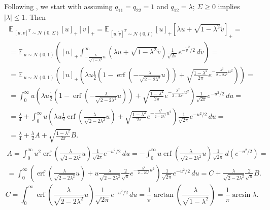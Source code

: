 \documentclass{article}
\newcommand{\EE}{\mathbb{E}\,}
\newcommand{\NN}{\mathcal{N}}
\DeclareMathOperator*{\erf}{erf}
\begin{document}
    Following \cite{arora2019exact}, we start with assuming $q_{11} = q_{22} = 1$ and $q_{12} = \lambda$; $\Sigma \geq 0$ implies $|\lambda| \leq 1$.
    Then
    \begin{multline}
        \EE_{[u,v]^T \sim \NN(0,\Sigma)} [u]_+ [v]_+
        = \EE_{[u,\tilde v]^T \sim \NN(0,I)} [u]_+ \left[\lambda u + \sqrt{1-\lambda^2} \tilde v\right]_+
        =\\= \EE_{u \sim \NN(0,1)} \left([u]_+ \int_{-\frac{\lambda}{\sqrt{1-\lambda^2}} u}^\infty \left(\lambda u + \sqrt{1-\lambda^2} \tilde v\right) \frac{1}{\sqrt{2\pi}} e^{-\tilde v^2/2} \, d\tilde v \right)
        =\\= \EE_{u \sim \NN(0,1)} \left(
            [u]_+ \left(
                \lambda u \frac{1}{2} \left(1 - \erf\left(-\frac{\lambda}{\sqrt{2-2\lambda^2}} u\right)\right) + \sqrt{\frac{1-\lambda^2}{2\pi}} e^{-\frac{\lambda^2}{2-2\lambda^2} u^2}
            \right)
        \right)
        =\\= \int_0^\infty u \left(\lambda u \frac{1}{2} \left(1 - \erf\left(-\frac{\lambda}{\sqrt{2-2\lambda^2}} u\right)\right) + \sqrt{\frac{1-\lambda^2}{2\pi}} e^{-\frac{\lambda^2}{2-2\lambda^2} u^2}\right) \frac{1}{\sqrt{2\pi}} e^{-u^2/2} \, du
        =\\= \frac{\lambda}{4} + \int_0^\infty u \left(\lambda u \frac{1}{2} \erf\left(\frac{\lambda}{\sqrt{2-2\lambda^2}} u\right) + \sqrt{\frac{1-\lambda^2}{2\pi}} e^{-\frac{\lambda^2}{2-2\lambda^2} u^2}\right) \frac{1}{\sqrt{2\pi}} e^{-u^2/2} \, du
        =\\= \frac{\lambda}{4} + \frac{\lambda}{2} A + \sqrt{\frac{1-\lambda^2}{2\pi}} B.
    \end{multline}
    \begin{multline}
        A
        = \int_0^\infty u^2 \erf\left(\frac{\lambda}{\sqrt{2-2\lambda^2}} u\right) \frac{1}{\sqrt{2\pi}} e^{-u^2/2} \, du
        = -\int_0^\infty u \erf\left(\frac{\lambda}{\sqrt{2-2\lambda^2}} u\right) \frac{1}{\sqrt{2\pi}} \, d\left(e^{-u^2/2}\right)
        =\\= \int_0^\infty \left(\erf\left(\frac{\lambda}{\sqrt{2-2\lambda^2}} u\right) + u \frac{\lambda}{\sqrt{2-2\lambda^2}} \frac{2}{\sqrt{\pi}} e^{-\frac{\lambda^2}{2-2\lambda^2} u^2} \right) \frac{1}{\sqrt{2\pi}} e^{-u^2/2} \, du
        = C + \frac{\lambda}{\sqrt{2-2\lambda^2}} \frac{2}{\sqrt{\pi}} B.
    \end{multline}
    \begin{equation}
        C
        = \int_0^\infty \erf\left(\frac{\lambda}{\sqrt{2-2\lambda^2}} u\right) \frac{1}{\sqrt{2\pi}} e^{-u^2/2} \, du
        = \frac{1}{\pi} \arctan\left(\frac{\lambda}{\sqrt{1-\lambda^2}}\right)
        = \frac{1}{\pi} \arcsin\lambda.
    \end{equation}
\end{document}

